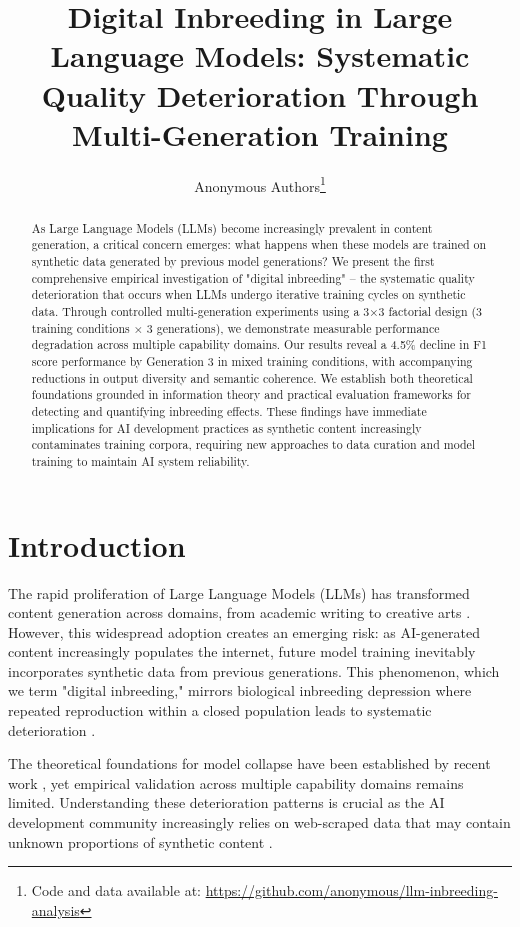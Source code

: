 \documentclass{article}
\title{Digital Inbreeding in Large Language Models: Systematic Quality Deterioration Through Multi-Generation Training}
\author{
Anonymous Authors\thanks{Code and data available at: \url{https://github.com/anonymous/llm-inbreeding-analysis}}
}
\begin{document}
\maketitle

\begin{abstract}
As Large Language Models (LLMs) become increasingly prevalent in content generation, a critical concern emerges: what happens when these models are trained on synthetic data generated by previous model generations? We present the first comprehensive empirical investigation of "digital inbreeding" -- the systematic quality deterioration that occurs when LLMs undergo iterative training cycles on synthetic data. Through controlled multi-generation experiments using a 3×3 factorial design (3 training conditions × 3 generations), we demonstrate measurable performance degradation across multiple capability domains. Our results reveal a 4.5\% decline in F1 score performance by Generation 3 in mixed training conditions, with accompanying reductions in output diversity and semantic coherence. We establish both theoretical foundations grounded in information theory and practical evaluation frameworks for detecting and quantifying inbreeding effects. These findings have immediate implications for AI development practices as synthetic content increasingly contaminates training corpora, requiring new approaches to data curation and model training to maintain AI system reliability.
\end{abstract}

\section{Introduction}

The rapid proliferation of Large Language Models (LLMs) has transformed content generation across domains, from academic writing to creative arts \citep{brown2020language,chowdhery2022palm}. However, this widespread adoption creates an emerging risk: as AI-generated content increasingly populates the internet, future model training inevitably incorporates synthetic data from previous generations. This phenomenon, which we term "digital inbreeding," mirrors biological inbreeding depression where repeated reproduction within a closed population leads to systematic deterioration \citep{charlesworth2009fundamental}.

The theoretical foundations for model collapse have been established by recent work \citep{shumailov2023curse,alemohammad2023self}, yet empirical validation across multiple capability domains remains limited. Understanding these deterioration patterns is crucial as the AI development community increasingly relies on web-scraped data that may contain unknown proportions of synthetic content \citep{gao2020pile}.
\end{document}
